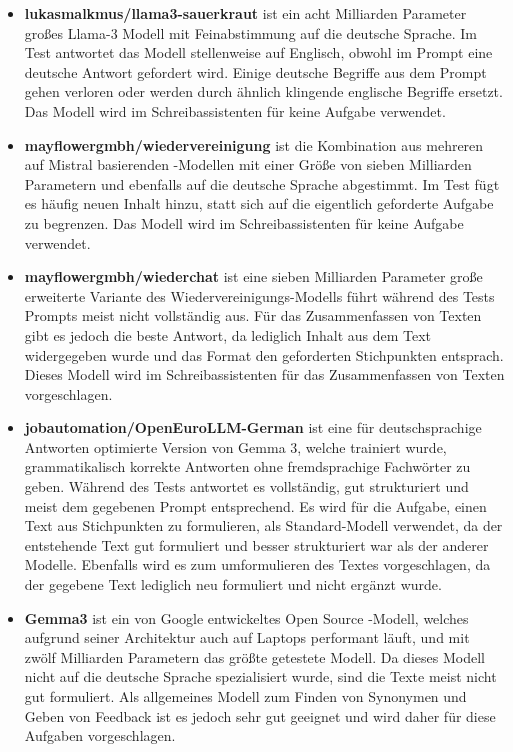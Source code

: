 \documentclass[../main.tex]{subfiles}
\begin{document}
\begin{itemize}

\item \textbf{lukasmalkmus/llama3-sauerkraut} ist ein acht Milliarden Parameter großes Llama-3 Modell mit Feinabstimmung auf die deutsche Sprache\cite{sauerkraut}. Im Test antwortet das Modell stellenweise auf Englisch, obwohl im Prompt eine deutsche Antwort gefordert wird. Einige deutsche Begriffe aus dem Prompt gehen verloren oder werden durch ähnlich klingende englische Begriffe ersetzt. Das Modell wird im Schreibassistenten für keine Aufgabe verwendet.

\item \textbf{mayflowergmbh/wiedervereinigung} ist die Kombination aus mehreren auf Mistral basierenden -Modellen mit einer Größe von sieben Milliarden Parametern und ebenfalls auf die deutsche Sprache abgestimmt\cite{wiedervereinigung}. Im Test fügt es häufig neuen Inhalt hinzu, statt sich auf die eigentlich geforderte Aufgabe zu begrenzen. Das Modell wird im Schreibassistenten für keine Aufgabe verwendet.

\item \textbf{mayflowergmbh/wiederchat} ist eine sieben Milliarden Parameter große erweiterte Variante des Wiedervereinigungs-Modells führt während des Tests Prompts meist nicht vollständig aus\cite{wiederchat}. Für das Zusammenfassen von Texten gibt es jedoch die beste Antwort, da lediglich Inhalt aus dem Text widergegeben wurde und das Format den geforderten Stichpunkten entsprach. Dieses Modell wird im Schreibassistenten für das Zusammenfassen von Texten vorgeschlagen.

\item \textbf{jobautomation/OpenEuroLLM-German} ist eine für deutschsprachige Antworten optimierte Version von Gemma 3, welche trainiert wurde, grammatikalisch korrekte Antworten ohne fremdsprachige Fachwörter zu geben\cite{openeurollm}. Während des Tests antwortet es vollständig, gut strukturiert und meist dem gegebenen Prompt entsprechend. Es wird für die Aufgabe, einen Text aus Stichpunkten zu formulieren, als Standard-Modell verwendet, da der entstehende Text gut formuliert und besser strukturiert war als der anderer Modelle. Ebenfalls wird es zum umformulieren des Textes vorgeschlagen, da der gegebene Text lediglich neu formuliert und nicht ergänzt wurde.  

\item \textbf{Gemma3} ist ein von Google entwickeltes Open Source -Modell, welches aufgrund seiner Architektur auch auf Laptops performant läuft, und mit zwölf Milliarden Parametern das größte getestete Modell\cite{gemma3}. Da dieses Modell nicht auf die deutsche Sprache spezialisiert wurde, sind die Texte meist nicht gut formuliert. Als allgemeines Modell zum Finden von Synonymen und Geben von Feedback ist es jedoch sehr gut geeignet und wird daher für diese Aufgaben vorgeschlagen. 

\end{itemize}
\end{document}
